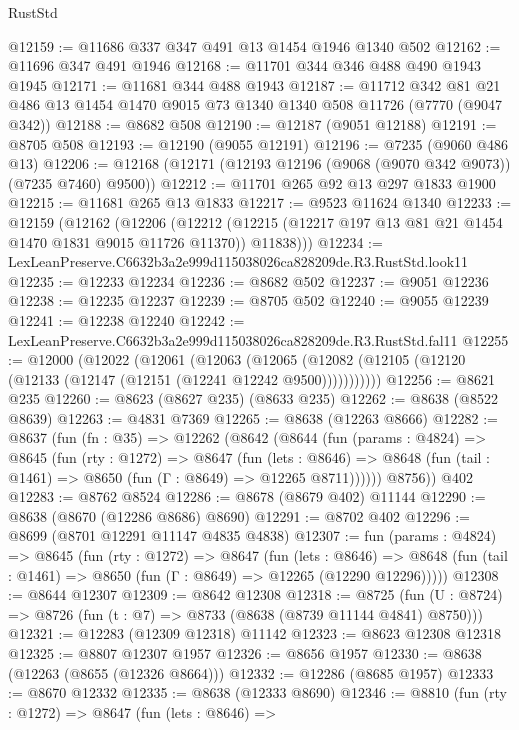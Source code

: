 \begin{lexlean}{RustStd}
\begin{coremodule}
@12159 := @11686 @337 @347 @491 @13 @1454 @1946 @1340 @502
@12162 := @11696 @347 @491 @1946
@12168 := @11701 @344 @346 @488 @490 @1943 @1945
@12171 := @11681 @344 @488 @1943
@12187 := @11712
    @342
    @81
    @21
    @486
    @13
    @1454
    @1470
    @9015
    @73
    @1340
    @1340
    @508
    @11726
    (@7770 (@9047 @342))
@12188 := @8682 @508
@12190 := @12187 (@9051 @12188)
@12191 := @8705 @508
@12193 := @12190 (@9055 @12191)
@12196 := @7235 (@9060 @486 @13)
@12206 := @12168 (@12171 (@12193 @12196 (@9068 (@9070 @342 @9073)) (@7235 @7460) @9500))
@12212 := @11701 @265 @92 @13 @297 @1833 @1900
@12215 := @11681 @265 @13 @1833
@12217 := @9523 @11624 @1340
@12233 := @12159
    (@12162
      (@12206
        (@12212 (@12215 (@12217 @197 @13 @81 @21 @1454 @1470 @1831 @9015 @11726 @11370)) @11838)))
@12234 := LexLeanPreserve.C6632b3a2e999d115038026ca828209de.R3.RustStd.look11
@12235 := @12233 @12234
@12236 := @8682 @502
@12237 := @9051 @12236
@12238 := @12235 @12237
@12239 := @8705 @502
@12240 := @9055 @12239
@12241 := @12238 @12240
@12242 := LexLeanPreserve.C6632b3a2e999d115038026ca828209de.R3.RustStd.fal11
@12255 := @12000
    (@12022
      (@12061
        (@12063
          (@12065 (@12082 (@12105 (@12120 (@12133 (@12147 (@12151 (@12241 @12242 @9500)))))))))))
@12256 := @8621 @235
@12260 := @8623 (@8627 @235) (@8633 @235)
@12262 := @8638 (@8522 @8639)
@12263 := @4831 @7369
@12265 := @8638 (@12263 @8666)
@12282 := @8637
    (fun (fn : @35) =>
    @12262
      (@8642
        (@8644
          (fun (params : @4824) =>
          @8645
            (fun (rty : @1272) =>
            @8647
              (fun (lets : @8646) =>
              @8648 (fun (tail : @1461) => @8650 (fun (Γ : @8649) => @12265 @8711))))))
        @8756))
    @402
@12283 := @8762 @8524
@12286 := @8678 (@8679 @402) @11144
@12290 := @8638 (@8670 (@12286 @8686) @8690)
@12291 := @8702 @402
@12296 := @8699 (@8701 @12291 @11147 @4835 @4838)
@12307 := fun (params : @4824) =>
  @8645
    (fun (rty : @1272) =>
    @8647
      (fun (lets : @8646) =>
      @8648 (fun (tail : @1461) => @8650 (fun (Γ : @8649) => @12265 (@12290 @12296)))))
@12308 := @8644 @12307
@12309 := @8642 @12308
@12318 := @8725
    (fun (U : @8724) => @8726 (fun (t : @7) => @8733 (@8638 (@8739 @11144 @4841) @8750)))
@12321 := @12283 (@12309 @12318) @11142
@12323 := @8623 @12308 @12318
@12325 := @8807 @12307 @1957
@12326 := @8656 @1957
@12330 := @8638 (@12263 (@8655 (@12326 @8664)))
@12332 := @12286 (@8685 @1957)
@12333 := @8670 @12332
@12335 := @8638 (@12333 @8690)
@12346 := @8810
    (fun (rty : @1272) =>
    @8647
      (fun (lets : @8646) =>

\end{coremodule}
\end{lexlean}
